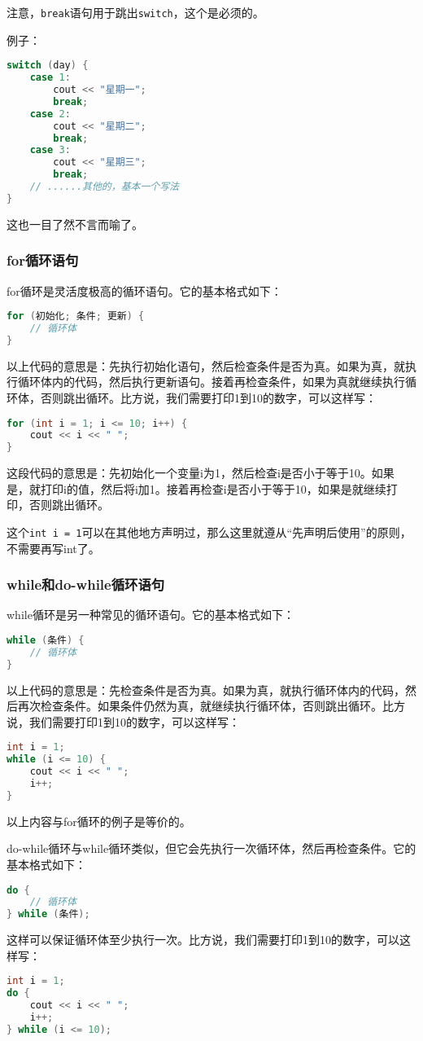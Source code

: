 \documentclass[../main.tex]{subfiles}
\begin{document}
注意，\texttt{break}语句用于跳出\texttt{switch}，这个是必须的。

例子：
\begin{lstlisting}[language=C++]
switch (day) {
    case 1:
        cout << "星期一";
        break;
    case 2:
        cout << "星期二";
        break;
    case 3:
        cout << "星期三";
        break;
    // ......其他的，基本一个写法
}
\end{lstlisting}
这也一目了然不言而喻了。

\subsubsection{for循环语句}

for循环是灵活度极高的循环语句。它的基本格式如下：
\begin{lstlisting}[language=C++]
for (初始化; 条件; 更新) {
    // 循环体
}
\end{lstlisting}
以上代码的意思是：先执行初始化语句，然后检查条件是否为真。如果为真，就执行循环体内的代码，然后执行更新语句。接着再检查条件，如果为真就继续执行循环体，否则跳出循环。比方说，我们需要打印1到10的数字，可以这样写：
\begin{lstlisting}[language=C++]
for (int i = 1; i <= 10; i++) {
    cout << i << " ";
}
\end{lstlisting}
这段代码的意思是：先初始化一个变量i为1，然后检查i是否小于等于10。如果是，就打印i的值，然后将i加1。接着再检查i是否小于等于10，如果是就继续打印，否则跳出循环。

这个\texttt{int i = 1}可以在其他地方声明过，那么这里就遵从“先声明后使用”的原则，不需要再写int了。

\subsubsection{while和do-while循环语句}
while循环是另一种常见的循环语句。它的基本格式如下：
\begin{lstlisting}[language=C++]
while (条件) {
    // 循环体
}
\end{lstlisting}
以上代码的意思是：先检查条件是否为真。如果为真，就执行循环体内的代码，然后再次检查条件。如果条件仍然为真，就继续执行循环体，否则跳出循环。比方说，我们需要打印1到10的数字，可以这样写：
\begin{lstlisting}[language=C++]
int i = 1;
while (i <= 10) {
    cout << i << " ";
    i++;
}
\end{lstlisting}
以上内容与for循环的例子是等价的。

do-while循环与while循环类似，但它会先执行一次循环体，然后再检查条件。它的基本格式如下：
\begin{lstlisting}[language=C++]
do {
    // 循环体
} while (条件);
\end{lstlisting}
这样可以保证循环体至少执行一次。比方说，我们需要打印1到10的数字，可以这样写：
\begin{lstlisting}[language=C++]
int i = 1;
do {
    cout << i << " ";
    i++;
} while (i <= 10);
\end{lstlisting}
\end{document}
